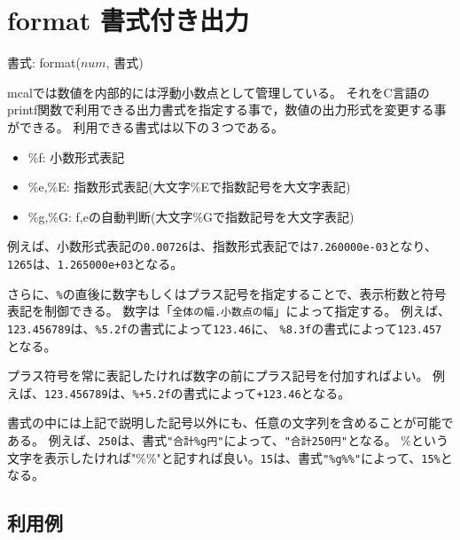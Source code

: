 
%

\section{format 書式付き出力\label{sect:format}}

書式: format($num$, 書式)

mcalでは数値を内部的には浮動小数点として管理している。
それをC言語のprintf関数で利用できる出力書式を指定する事で，数値の出力形式を変更する事ができる。
利用できる書式は以下の３つである。

\begin{itemize}
\item \%f: 小数形式表記
\item \%e,\%E: 指数形式表記(大文字\%Eで指数記号を大文字表記)
\item \%g,\%G: f,eの自動判断(大文字\%Gで指数記号を大文字表記)
\end{itemize}

例えば、小数形式表記の\verb|0.00726|は、指数形式表記では\verb|7.260000e-03|となり、
\verb|1265|は、\verb|1.265000e+03|となる。

さらに、\verb|%|の直後に数字もしくはプラス記号を指定することで、表示桁数と符号表記を制御できる。
数字は「\verb|全体の幅.小数点の幅|」によって指定する。
例えば、\verb|123.456789|は、\verb|%5.2f|の書式によって\verb|123.46|に、
\verb|%8.3f|の書式によって\verb|123.457|となる。

プラス符号を常に表記したければ数字の前にプラス記号を付加すればよい。
例えば、\verb|123.456789|は、\verb|%+5.2f|の書式によって\verb|+123.46|となる。

書式の中には上記で説明した記号以外にも、任意の文字列を含めることが可能である。
例えば、\verb|250|は、書式\verb|"合計%g円"|によって、\verb|"合計250円"|となる。
\%という文字を表示したければ"\%\%"と記すれば良い。\verb|15|は、書式\verb|"%g%%"|によって、\verb|15%|となる。


\subsection*{利用例}


%

